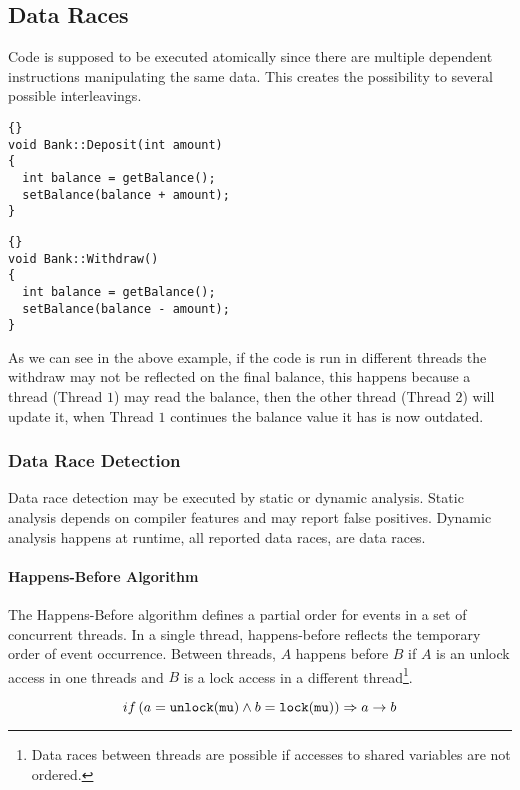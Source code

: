 \subsection{Data Races}
Code is supposed to be executed atomically since there are multiple dependent instructions manipulating the same data.
This creates the possibility to several possible interleavings.

\begin{lstlisting}[caption=Deposit Operation.]{}
void Bank::Deposit(int amount)
{
  int balance = getBalance();
  setBalance(balance + amount);
}
\end{lstlisting}

\begin{lstlisting}[caption=Withdraw Operation.]{}
void Bank::Withdraw()
{
  int balance = getBalance();
  setBalance(balance - amount);
}
\end{lstlisting}

As we can see in the above example,
if the code is run in different threads the withdraw may not be reflected on the final balance,
this happens because a thread (Thread $1$) may read the balance,
then the other thread (Thread $2$) will update it,
when Thread $1$ continues the balance value it has is now outdated.

\subsubsection{Data Race Detection}

Data race detection may be executed by static or dynamic analysis.
Static analysis depends on compiler features and may report false positives.
Dynamic analysis happens at runtime, all reported data races, are data races.

\paragraph{Happens-Before Algorithm}
The Happens-Before algorithm defines a partial order for events in a set of concurrent threads.
In a single thread, happens-before reflects the temporary order of event occurrence.
Between threads, $A$ happens before $B$ if $A$ is an unlock access in one threads
and $B$ is a lock access in a different thread\footnote{Data races between threads are possible if accesses to shared variables are not ordered.}.

\begin{equation}
  \mathnormal{if}\left(a = \mathtt{unlock(mu)} \wedge b = \mathtt{lock(mu)}\right) \Rightarrow a \rightarrow b
\end{equation}

